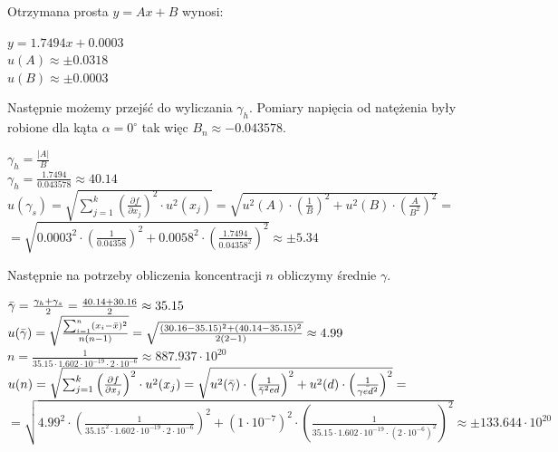 \documentclass{article}
\begin{document}
Otrzymana prosta $y=Ax+B$ wynosi:\\
\begin{center}
    $y=1.7494x+0.0003$\\
    $u(A)\approx\pm0.0318$\\
    $u(B)\approx\pm0.0003$\\
\end{center}
Następnie możemy przejść do wyliczania $\gamma_{h}$. Pomiary napięcia od natężenia były robione dla kąta $\alpha=0^{\circ}$ tak więc $B_{n}\approx-0.043578$.\\
\begin{center}
    $\gamma_{h}=\frac{|A|}{B}$\\
    \vspace{2.5ex}
    $\gamma_{h}=\frac{1.7494}{0.043578}\approx 40.14$\\
    \vspace{2.5ex}
    $u(\gamma_{s})=\sqrt{\sum^{k}_{j=1}\left(\frac{\partial f}{\partial x_{j}}\right)^{2}\cdot u^{2}(x_{j})}=\sqrt{u^{2}(A)\cdot\left(\frac{1}{B}\right)^{2}+u^{2}(B)\cdot(\frac{A}{B^{2}})^{2}}=$\\
    \vspace{2.5ex}
    $=\sqrt{0.0003^{2}\cdot\left(\frac{1}{0.04358}\right)^{2}+0.0058^{2}\cdot(\frac{1.7494}{0.04358^{2}})^{2}}  \approx\pm5.34$\\
\end{center}{}
\newpage
Następnie na potrzeby obliczenia koncentracji $n$ obliczymy średnie $\gamma$.\\
\begin{center}
    $\Bar{\gamma}=\frac{\gamma_{h}+\gamma_{s}}{2}=\frac{40.14+30.16}{2}\approx35.15$\\
    \vspace{2.5ex}
    $u(\Bar{\gamma})=\sqrt{\frac{\sum^{n}_{i=1}(x_{i}-\Bar{x})^{2}}{n(n-1)}}=\sqrt{\frac{(30.16-35.15)^{2}+(40.14-35.15)^{2}}{2(2-1)}}\approx 4.99$\\
    \vspace{2.5ex}
    $n=\frac{1}{35.15\cdot1.602\cdot10^{-19}\cdot2\cdot10^{-6}}\approx 887.937\cdot10^{20}$\\
    \vspace{2.5ex}
    $u(n)=\sqrt{\sum^{k}_{j=1}\left(\frac{\partial f}{\partial x_{j}}\right)^{2}\cdot u^{2}(x_{j})}=\sqrt{u^{2}(\Bar{\gamma})\cdot\left(\frac{1}{\Bar{\gamma}^{2}ed}\right)^{2}+u^{2}(d)\cdot\left(\frac{1}{\Bar{\gamma e d^{2}}}\right)^{2}}=$\\
    $=\sqrt{4.99^{2}\cdot\left(\frac{1}{35.15^{2}\cdot1.602\cdot10^{-19}\cdot2\cdot10^{-6}}\right)^{2}+(1\cdot10^{-7})^{2}\cdot\left(\frac{1}{35.15\cdot 1.602\cdot10^{-19}\cdot (2\cdot10^{-6})^{2}}\right)^{2}}\approx \pm133.644\cdot10^{20}$\\
\end{center}
\end{document}
